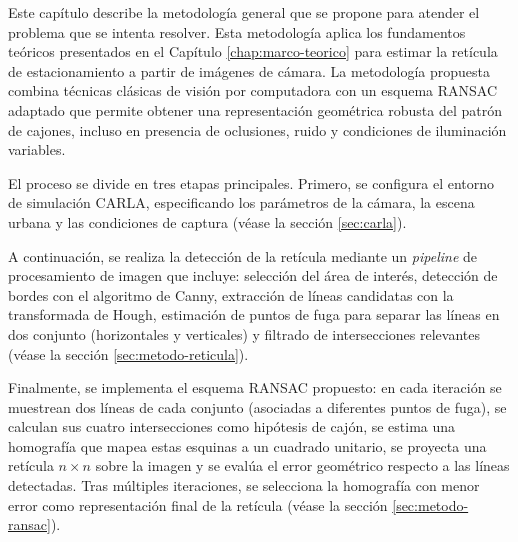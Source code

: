 
Este capítulo describe la metodología general que se propone para atender el problema que se intenta resolver. Esta metodología aplica los fundamentos teóricos presentados en el Capítulo \ref{chap:marco-teorico} para estimar la retícula de estacionamiento a partir de imágenes de cámara. La metodología propuesta combina técnicas clásicas de visión por computadora con un esquema RANSAC adaptado que permite obtener una representación geométrica robusta del patrón de cajones, incluso en presencia de oclusiones, ruido y condiciones de iluminación variables.

El proceso se divide en tres etapas principales. Primero, se configura el entorno de simulación CARLA, especificando los parámetros de la cámara, la escena urbana y las condiciones de captura (véase la sección \ref{sec:carla}).

A continuación, se realiza la detección de la retícula mediante un \emph{pipeline} de procesamiento de imagen que incluye: selección del área de interés, detección de bordes con el algoritmo de Canny, extracción de líneas candidatas con la transformada de Hough, estimación de puntos de fuga para separar las líneas en dos conjunto (horizontales y verticales) y filtrado de intersecciones relevantes (véase la sección \ref{sec:metodo-reticula}).

Finalmente, se implementa el esquema RANSAC propuesto: en cada iteración se muestrean dos líneas de cada conjunto (asociadas a diferentes puntos de fuga), se calculan sus cuatro intersecciones como hipótesis de cajón, se estima una homografía que mapea estas esquinas a un cuadrado unitario, se proyecta una retícula $n\times n$ sobre la imagen y se evalúa el error geométrico respecto a las líneas detectadas. Tras múltiples iteraciones, se selecciona la homografía con menor error como representación final de la retícula (véase la sección \ref{sec:metodo-ransac}).